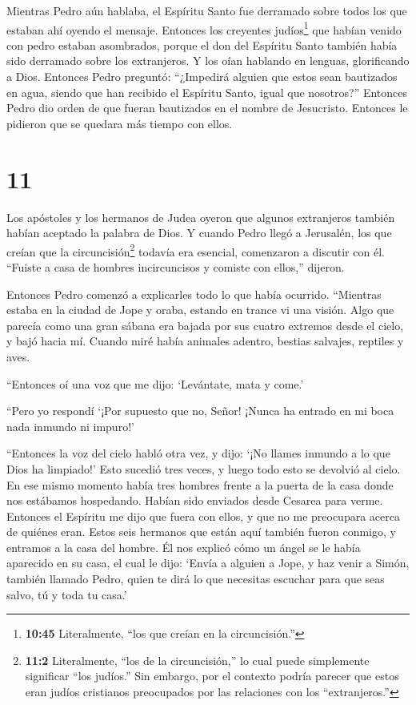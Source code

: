  Mientras Pedro aún hablaba, el Espíritu Santo fue
derramado sobre todos los que estaban ahí oyendo el mensaje.
 Entonces los creyentes judíos\footnote{\textbf{10:45}
  Literalmente, ``los que creían en la circuncisión.''} que habían
venido con pedro estaban asombrados, porque el don del Espíritu Santo
también había sido derramado sobre los extranjeros.  Y los
oían hablando en lenguas, glorificando a Dios.  Entonces
Pedro preguntó: ``¿Impedirá alguien que estos sean bautizados en agua,
siendo que han recibido el Espíritu Santo, igual que nosotros?''
 Entonces Pedro dio orden de que fueran bautizados en el
nombre de Jesucristo. Entonces le pidieron que se quedara más tiempo con
ellos.

\hypertarget{section-10}{%
\section{11}\label{section-10}}

 Los apóstoles y los hermanos de Judea oyeron que algunos
extranjeros también habían aceptado la palabra de Dios.  Y
cuando Pedro llegó a Jerusalén, los que creían que la
circuncisión\footnote{\textbf{11:2} Literalmente, ``los de la
  circuncisión,'' lo cual puede simplemente significar ``los judíos.''
  Sin embargo, por el contexto podría parecer que estos eran judíos
  cristianos preocupados por las relaciones con los ``extranjeros.''}
todavía era esencial, comenzaron a discutir con él. 
``Fuiste a casa de hombres incircuncisos y comiste con ellos,'' dijeron.

 Entonces Pedro comenzó a explicarles todo lo que había
ocurrido.  ``Mientras estaba en la ciudad de Jope y oraba,
estando en trance vi una visión. Algo que parecía como una gran sábana
era bajada por sus cuatro extremos desde el cielo, y bajó hacia mí.
 Cuando miré había animales adentro, bestias salvajes,
reptiles y aves.

 ``Entonces oí una voz que me dijo: `Levántate, mata y
come.'

 ``Pero yo respondí `¡Por supuesto que no, Señor! ¡Nunca ha
entrado en mi boca nada inmundo ni impuro!'

 ``Entonces la voz del cielo habló otra vez, y dijo: `¡No
llames inmundo a lo que Dios ha limpiado!'  Esto sucedió
tres veces, y luego todo esto se devolvió al cielo.  En ese
mismo momento había tres hombres frente a la puerta de la casa donde nos
estábamos hospedando. Habían sido enviados desde Cesarea para verme.
 Entonces el Espíritu me dijo que fuera con ellos, y que no
me preocupara acerca de quiénes eran. Estos seis hermanos que están aquí
también fueron conmigo, y entramos a la casa del hombre. 
Él nos explicó cómo un ángel se le había aparecido en su casa, el cual
le dijo: `Envía a alguien a Jope, y haz venir a Simón, también llamado
Pedro,  quien te dirá lo que necesitas escuchar para que
seas salvo, tú y toda tu casa.'

